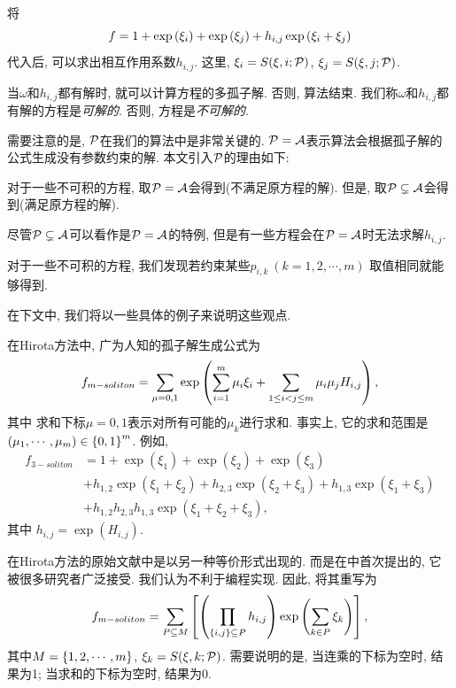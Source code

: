 将
\begin{equation}
    f=1+\exp\left(\xi_i\right)+\exp\left(\xi_j\right)+h_{i,j}\exp\left(\xi_i+\xi_j\right) \label{hij}
\end{equation}
代入后, 可以求出相互作用系数$h_{i,j}$. 这里, $\xi_i=S(\xi,i;\mathcal{P})$, $\xi_j=S(\xi,j;\mathcal{P})$.

当$\omega$和$h_{i,j}$都有解时, 就可以计算方程的多孤子解. 否则, 算法结束. 我们称$\omega$和$h_{i,j}$都有解的方程是\emph{可解的}. 否则, 方程是\emph{不可解的}.

需要注意的是, $\mathcal{P}$在我们的算法中是非常关键的. $\mathcal{P}= \mathcal{A}$表示算法会根据孤子解的公式生成没有参数约束的解. 本文引入$\mathcal{P}$的理由如下: 
\begin{compactenum}[1. ]
\item 对于一些不可积的方程, 取$\mathcal{P}= \mathcal{A}$会得到\emph{\FalseSol{}}(不满足原方程的解). 但是, 取$\mathcal{P}\subsetneq  \mathcal{A}$会得到\emph{\TrueSol{}}(满足原方程的解).
\item 尽管$\mathcal{P}\subsetneq  \mathcal{A}$可以看作是$\mathcal{P}= \mathcal{A}$的特例, 但是有一些方程会在$\mathcal{P}= \mathcal{A}$时无法求解$h_{i,j}$.
\item 对于一些不可积的方程, 我们发现若约束某些$p_{i,k}~(k=1,2,\cdots,m)$ 取值相同就能够得到\TrueSol{}.
\end{compactenum}
在下文中, 我们将以一些具体的例子来说明这些观点. 

在Hirota方法中, 广为人知的孤子解生成公式为\cite{hirota1973exact}
\begin{equation}
    f_{m-soliton}=\sum_{\mu=0,1}\exp\left(\sum_{i=1}^m{\mu_i \xi_i}+\sum_{1\le i<j\le m}{\mu_i\mu_jH_{i,j}}\right), \label{f-soliton-old}
\end{equation}
其中 求和下标$\mu=0,1$表示对所有可能的$\mu_k$进行求和. 事实上, 它的求和范围是$\left(\mu_1,\cdots,\mu_m\right)\in \left\{0,1\right\}^m$. 例如, 
\begin{equation}
\begin{split}
f_{3-soliton}&=1+\exp(\xi_1)+\exp(\xi_2)+\exp(\xi_3)\\
&+h_{1,2}\exp(\xi_1+\xi_2)+h_{2,3}\exp(\xi_2+\xi_3)+h_{1,3}\exp(\xi_1+\xi_3)\\
&+h_{1,2}h_{2,3}h_{1,3}\exp(\xi_1+\xi_2+\xi_3), 
\end{split}
\end{equation}
其中 $h_{i,j}=\exp(H_{i,j})$.

在Hirota方法的原始文献\cite{hirota1971exact}中是以另一种等价形式出现的. 而是在中首次提出的, 它被很多研究者广泛接受. 我们认为不利于编程实现. 因此, 将其重写为
\begin{equation}
    f_{m-soliton}=\sum_{P\subseteq M}\left[\left(\prod_{\left\{i,j\right\}\subseteq P}{h_{i,j}}\right)\exp\left(\sum_{k\in P}{\xi_k}\right)\right], \label{f-soliton-new}
\end{equation}
其中$M=\left\{1,2,\cdots,m\right\}$, $\xi_k=S(\xi,k;\mathcal{P})$. 需要说明的是, 当连乘的下标为空时, 结果为1; 当求和的下标为空时, 结果为0. 

